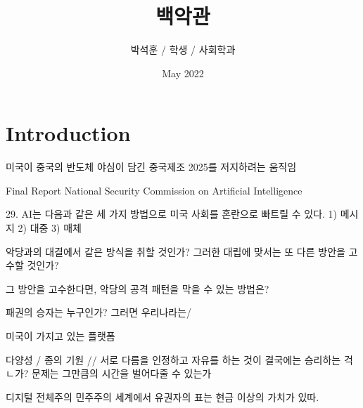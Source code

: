\documentclass{article}
\title{백악관}
\author{박석훈 / 학생 / 사회학과 }
\date{May 2022}
\begin{document}
\maketitle

\section{Introduction}

미국이 중국의 반도체 야심이 담긴 중국제조 2025를 저지하려는 움직임

Final Report National Security Commission on Artificial Intelligence


29. AI는 다음과 같은 세 가지 방법으로 미국 사회를 혼란으로 빠트릴 수 있다. 1) 메시지 2) 대중 3) 매체

악당과의 대결에서 같은 방식을 취할 것인가? 그러한 대립에 맞서는 또 다른 방안을 고수할 것인가?

그 방안을 고수한다면, 악당의 공격 패턴을 막을 수 있는 방법은? 

패권의 승자는 누구인가? 그러면 우리나라는/

미국이 가지고 있는 플랫폼

다양성 / 종의 기원 // 서로 다름을 인정하고 자유를 하는 것이 결국에는 승리하는 걱ㄴ가? 문제는 그만큼의 시간을 벌어다줄 수 있는가

디지털 전체주의
민주주의 세계에서 유권자의 표는 현금 이상의 가치가 있따.
\end{document}
